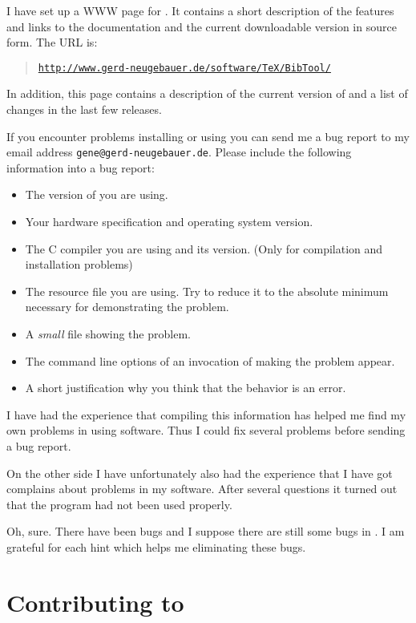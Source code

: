 \documentclass[11pt,a4paper]{scrbook}
\makeatletter
\newcommand\Link[2]{\href{#1}{\texttt{#2}}}
\let\BIBTEX\BibTeX
\renewcommand\BibTeX{\BIBTEX\index{bibtex@\BIBTEX}}
\makeatother
\begin{document}
I have set up a WWW page for \BibTool. It contains a short description of the
features and links to the documentation and the current downloadable version
in source form. The URL is:

\begin{quote}
  \Link{http://www.gerd-neugebauer.de/software/TeX/BibTool/}{http://www.gerd-neugebauer.de/software/TeX/BibTool/}
\end{quote}

In addition, this page contains a description of the current version of
\BibTool{} and a list of changes in the last few releases.

If you encounter problems installing or using \BibTool{} you can send me a bug
report to my email address \texttt{gene@gerd-neugebauer.de}. Please include
the following information into a bug report:
\begin{itemize}
\item The version of \BibTool{} you are using.
\item Your hardware specification and operating system version.
\item The C compiler you are using and its version. (Only for compilation and
  installation problems)
\item The resource file you are using. Try to reduce it to the absolute
  minimum necessary for demonstrating the problem.
\item A \emph{small} \BibTeX{} file showing the problem.
\item The command line options of an invocation of \BibTool{} making
  the problem appear.
\item A short justification why you think that the behavior is an error.
\end{itemize}

I have had the experience that compiling this information has helped me find
my own problems in using software. Thus I could fix several problems before
sending a bug report.

On the other side I have unfortunately also had the experience that I have got
complains about problems in my software. After several questions it turned out
that the program had not been used properly.

Oh, sure. There have been bugs and I suppose there are still some bugs in
\BibTool. I am grateful for each hint which helps me eliminating these bugs.



\section{Contributing to \BibTool}
\end{document}
